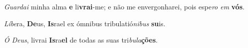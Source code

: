 \begin{greenumerate}
  \switchcolumn%

  \item \textit{Guardai} minha alma \textbf{e} li\textbf{vrai}-me; {\GreStar} e não me envergonharei, pois espe\textit{ro em} \textbf{vós}. 

  \switchcolumn*


  \item \textit{Líbe}ra, \textbf{De}us, \textbf{Is}rael {\GreStar} ex ómnibus tribulatió\textit{nibus} \textbf{su}is. 

  \switchcolumn%

  \item \textit{Ó Deus}, livrai \textbf{Is}ra\textbf{el} {\GreStar} de todas as suas tri\textit{bula}\textbf{ções}. 
\end{greenumerate}